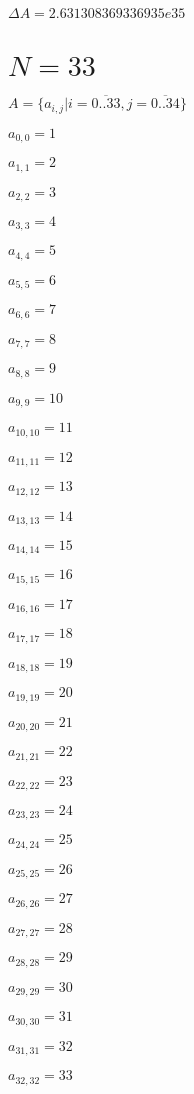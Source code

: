 \documentclass[a4paper,12pt]{article}
\begin{document}
$\Delta A = 2.631308369336935e35$



\section{ $N = 33$ }
$A = \{ a _{ i, j } | i = \overline { 0..33 }, j = \overline { 0..34 } \}$

$a _{ 0, 0 } = 1$

$a _{ 1, 1 } = 2$

$a _{ 2, 2 } = 3$

$a _{ 3, 3 } = 4$

$a _{ 4, 4 } = 5$

$a _{ 5, 5 } = 6$

$a _{ 6, 6 } = 7$

$a _{ 7, 7 } = 8$

$a _{ 8, 8 } = 9$

$a _{ 9, 9 } = 10$

$a _{ 10, 10 } = 11$

$a _{ 11, 11 } = 12$

$a _{ 12, 12 } = 13$

$a _{ 13, 13 } = 14$

$a _{ 14, 14 } = 15$

$a _{ 15, 15 } = 16$

$a _{ 16, 16 } = 17$

$a _{ 17, 17 } = 18$

$a _{ 18, 18 } = 19$

$a _{ 19, 19 } = 20$

$a _{ 20, 20 } = 21$

$a _{ 21, 21 } = 22$

$a _{ 22, 22 } = 23$

$a _{ 23, 23 } = 24$

$a _{ 24, 24 } = 25$

$a _{ 25, 25 } = 26$

$a _{ 26, 26 } = 27$

$a _{ 27, 27 } = 28$

$a _{ 28, 28 } = 29$

$a _{ 29, 29 } = 30$

$a _{ 30, 30 } = 31$

$a _{ 31, 31 } = 32$

$a _{ 32, 32 } = 33$
\end{document}
